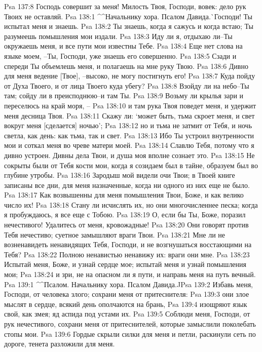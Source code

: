 Psa 137:8  Господь совершит за меня! Милость Твоя, Господи, вовек: дело рук Твоих не оставляй.
Psa 138:1  ^^Начальнику хора. Псалом Давида.^^ Господи! Ты испытал меня и знаешь.
Psa 138:2  Ты знаешь, когда я сажусь и когда встаю; Ты разумеешь помышления мои издали.
Psa 138:3  Иду ли я, отдыхаю ли--Ты окружаешь меня, и все пути мои известны Тебе.
Psa 138:4  Еще нет слова на языке моем, --Ты, Господи, уже знаешь его совершенно.
Psa 138:5  Сзади и спереди Ты объемлешь меня, и полагаешь на мне руку Твою.
Psa 138:6  Дивно для меня ведение [Твое], --высоко, не могу постигнуть его!
Psa 138:7  Куда пойду от Духа Твоего, и от лица Твоего куда убегу?
Psa 138:8  Взойду ли на небо--Ты там; сойду ли в преисподнюю--и там Ты.
Psa 138:9  Возьму ли крылья зари и переселюсь на край моря, --
Psa 138:10  и там рука Твоя поведет меня, и удержит меня десница Твоя.
Psa 138:11  Скажу ли: `может быть, тьма скроет меня, и свет вокруг меня [сделается] ночью';
Psa 138:12  но и тьма не затмит от Тебя, и ночь светла, как день: как тьма, так и свет.
Psa 138:13  Ибо Ты устроил внутренности мои и соткал меня во чреве матери моей.
Psa 138:14  Славлю Тебя, потому что я дивно устроен. Дивны дела Твои, и душа моя вполне сознает это.
Psa 138:15  Не сокрыты были от Тебя кости мои, когда я созидаем был в тайне, образуем был во глубине утробы.
Psa 138:16  Зародыш мой видели очи Твои; в Твоей книге записаны все дни, для меня назначенные, когда ни одного из них еще не было.
Psa 138:17  Как возвышенны для меня помышления Твои, Боже, и как велико число их!
Psa 138:18  Стану ли исчислять их, но они многочисленнее песка; когда я пробуждаюсь, я все еще с Тобою.
Psa 138:19  О, если бы Ты, Боже, поразил нечестивого! Удалитесь от меня, кровожадные!
Psa 138:20  Они говорят против Тебя нечестиво; суетное замышляют враги Твои.
Psa 138:21  Мне ли не возненавидеть ненавидящих Тебя, Господи, и не возгнушаться восстающими на Тебя?
Psa 138:22  Полною ненавистью ненавижу их: враги они мне.
Psa 138:23  Испытай меня, Боже, и узнай сердце мое; испытай меня и узнай помышления мои;
Psa 138:24  и зри, не на опасном ли я пути, и направь меня на путь вечный.
Psa 139:1  ^^Псалом. Начальнику хора. Псалом Давида.^^
Psa 139:2  Избавь меня, Господи, от человека злого; сохрани меня от притеснителя:
Psa 139:3  они злое мыслят в сердце, всякий день ополчаются на брань,
Psa 139:4  изощряют язык свой, как змея; яд аспида под устами их.
Psa 139:5  Соблюди меня, Господи, от рук нечестивого, сохрани меня от притеснителей, которые замыслили поколебать стопы мои.
Psa 139:6  Гордые скрыли силки для меня и петли, раскинули сеть по дороге, тенета разложили для меня.
